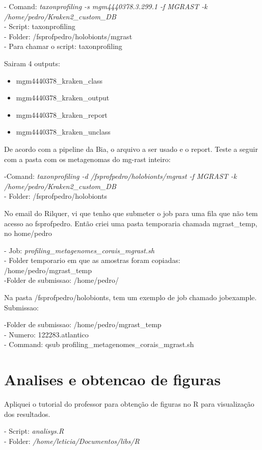\documentclass[12pt, a4paper]{report}
\begin{document}
\begin{tcolorbox}[width=6.3in]
- Comand: \textit{taxonprofiling -s mgm4440378.3.299.1 -f MGRAST -k /home/pedro/Kraken2\_custom\_DB}\\
- Script: taxonprofiling\\
- Folder: /fsprofpedro/holobionts/mgrast\\
- Para chamar o script: taxonprofiling
\end{tcolorbox}

Sairam 4 outputs:
\begin{itemize}
\item mgm4440378\_kraken\_class
\item mgm4440378\_kraken\_output
\item mgm4440378\_kraken\_report
\item mgm4440378\_kraken\_unclass
\end{itemize}

De acordo com a pipeline da Bia, o arquivo a ser usado e o report. Teste a seguir com a pasta com os metagenomas do mg-rast inteiro:

\begin{tcolorbox}[width=6.3in]
-Comand: \textit{taxonprofiling -d /fsprofpedro/holobionts/mgrast -f MGRAST -k /home/pedro/Kraken2\_custom\_DB}\\
- Folder: /fsprofpedro/holobionts
\end{tcolorbox}

No email do Rilquer, vi que tenho que submeter o job para uma fila que não tem acesso ao fsprofpedro. Então criei uma pasta temporaria chamada mgrast\_temp, no home/pedro

\begin{tcolorbox}
- Job: \textit{profiling\_metagenomes\_corais\_mgrast.sh}\\
- Folder temporario em que as amostras foram copiadas: /home/pedro/mgrast\_temp \\
-Folder de submissao:  /home/pedro/
\end{tcolorbox}

Na pasta /fsprofpedro/holobionts, tem um exemplo de job chamado jobexample. Submissao:
\begin{tcolorbox}
-Folder de submissao: /home/pedro/mgrast\_temp \\
- Numero: 122283.atlantico\\
- Command: qsub profiling\_metagenomes\_corais\_mgrast.sh
\end{tcolorbox}

\newpage
\section{Analises e obtencao de figuras}
Apliquei o tutorial do professor para obtenção de figuras no R para visualização dos resultados. \\
\begin{tcolorbox}[width=6.3in]
- Script: \textit{analisys.R}\\
- Folder: \textit{/home/leticia/Documentos/libs/R}
\end{tcolorbox}
\end{document}
